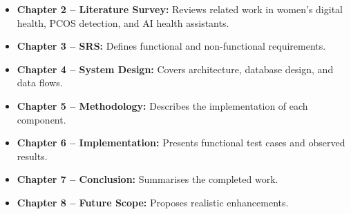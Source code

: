 \begin{itemize}
    \item \textbf{Chapter 2 -- Literature Survey:} Reviews related work in women's digital health, PCOS detection, and AI health assistants.
    \item \textbf{Chapter 3 -- SRS:} Defines functional and non-functional requirements.
    \item \textbf{Chapter 4 -- System Design:} Covers architecture, database design, and data flows.
    \item \textbf{Chapter 5 -- Methodology:} Describes the implementation of each component.
    \item \textbf{Chapter 6 -- Implementation:} Presents functional test cases and observed results.
    \item \textbf{Chapter 7 -- Conclusion:} Summarises the completed work.
    \item \textbf{Chapter 8 -- Future Scope:} Proposes realistic enhancements.
\end{itemize}
